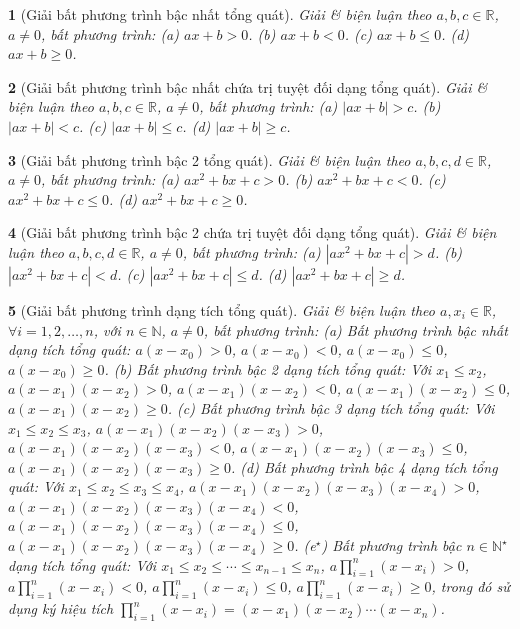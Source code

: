 \documentclass{article}
\newtheorem{baitoan}{}
\begin{document}
\begin{baitoan}[Giải bất phương trình bậc nhất tổng quát]
	Giải \& biện luận theo $a,b,c\in\mathbb{R}$, $a\ne0$, bất phương trình: (a) $ax + b > 0$. (b) $ax + b < 0$. (c) $ax + b\le0$. (d) $ax + b\ge0$.
\end{baitoan}

\begin{baitoan}[Giải bất phương trình bậc nhất chứa trị tuyệt đối dạng tổng quát]
	Giải \& biện luận theo $a,b,c\in\mathbb{R}$, $a\ne0$, bất phương trình: (a) $|ax + b| > c$. (b) $|ax + b| < c$. (c) $|ax + b|\le c$. (d) $|ax + b|\ge c$.
\end{baitoan}

\begin{baitoan}[Giải bất phương trình bậc 2 tổng quát]
	Giải \& biện luận theo $a,b,c,d\in\mathbb{R}$, $a\ne0$, bất phương trình: (a) $ax^2 + bx + c > 0$. (b) $ax^2 + bx + c < 0$. (c) $ax^2 + bx + c\le0$. (d) $ax^2 + bx + c\ge0$.
\end{baitoan}

\begin{baitoan}[Giải bất phương trình bậc 2 chứa trị tuyệt đối dạng tổng quát]
	Giải \& biện luận theo $a,b,c,d\in\mathbb{R}$, $a\ne0$, bất phương trình: (a) $|ax^2 + bx + c| > d$. (b) $|ax^2 + bx + c| < d$. (c) $|ax^2 + bx + c|\le d$. (d) $|ax^2 + bx + c|\ge d$.
\end{baitoan}

\begin{baitoan}[Giải bất phương trình dạng tích tổng quát]
	Giải \& biện luận theo $a,x_i\in\mathbb{R}$, $\forall i = 1,2,\ldots,n$, với $n\in\mathbb{N}$, $a\ne0$, bất phương trình: (a) {\rm Bất phương trình bậc nhất dạng tích tổng quát:} $a(x - x_0) > 0$, $a(x - x_0) < 0$, $a(x - x_0)\le0$, $a(x - x_0)\ge0$. (b) {\rm Bất phương trình bậc 2 dạng tích tổng quát:} Với $x_1\le x_2$, $a(x - x_1)(x - x_2) > 0$, $a(x - x_1)(x - x_2) < 0$, $a(x - x_1)(x - x_2)\le0$, $a(x - x_1)(x - x_2)\ge0$. (c) {\rm Bất phương trình bậc 3 dạng tích tổng quát:} Với $x_1\le x_2\le x_3$, $a(x - x_1)(x - x_2)(x - x_3) > 0$, $a(x - x_1)(x - x_2)(x - x_3) < 0$, $a(x - x_1)(x - x_2)(x - x_3)\le0$, $a(x - x_1)(x - x_2)(x - x_3)\ge0$. (d) {\rm Bất phương trình bậc 4 dạng tích tổng quát:} Với $x_1\le x_2\le x_3\le x_4$, $a(x - x_1)(x - x_2)(x - x_3)(x - x_4) > 0$, $a(x - x_1)(x - x_2)(x - x_3)(x - x_4) < 0$, $a(x - x_1)(x - x_2)(x - x_3)(x - x_4)\le0$, $a(x - x_1)(x - x_2)(x - x_3)(x - x_4)\ge0$. (e${}^\star$) {\rm Bất phương trình bậc $n\in\mathbb{N}^\star$ dạng tích tổng quát:} Với $x_1\le x_2\le\cdots\le x_{n-1}\le x_n$, $a\prod_{i=1}^n (x - x_i) > 0$, $a\prod_{i=1}^n (x - x_i) < 0$, $a\prod_{i=1}^n (x - x_i)\le0$, $a\prod_{i=1}^n (x - x_i)\ge0$, trong đó sử dụng ký hiệu tích $\prod_{i=1}^n (x - x_i) = (x - x_1)(x - x_2)\cdots(x - x_n)$.
\end{baitoan}
\end{document}
